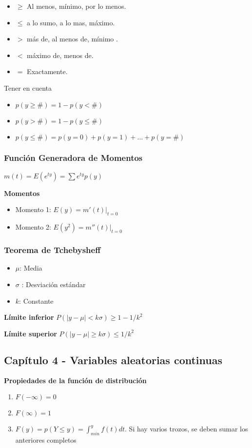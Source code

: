 \begin{itemize}
	\item $\geq$ Al menos, mínimo, por lo menos.
	\item $\leq$ a lo sumo, a lo mas, máximo.
	\item $>$ más de, al menos de, mínimo .
	\item $<$ máximo de, menos de.
	\item $=$ Exactamente.
\end{itemize}

Tener en cuenta
\begin{itemize}
	\item $p(y\geq \#)=1-p(y<\#)$
	\item $p(y> \#)=1-p(y\leq\#)$
	\item $p(y\leq\#)=p(y=0)+p(y=1)+\dots+p(y=\#)$
\end{itemize}

\subsubsection{Función Generadora de Momentos}
$m(t)=E(e^{ty})=\sum e^{ty}p(y)$

\textbf{Momentos}
\begin{itemize}
	\item Momento 1: $E(y)=m'(t)|_{t=0}$
	\item Momento 2: $E(y^2)=m''(t)|_{t=0}$
\end{itemize}

\subsubsection{Teorema de Tchebysheff}

\begin{itemize}
	\item $\mu$: Media
	\item $\sigma$ : Desviación estándar
	\item $k$: Constante
\end{itemize}

\textbf{Límite inferior}
$P(|y-\mu|<k\sigma)\geq 1- 1/k^2$

\textbf{Límite superior}
$P(|y-\mu|\geq k\sigma)\leq 1/k^2$

\subsection{Capítulo 4 - Variables aleatorias continuas}
\textbf{Propiedades de la función de distribución}
\begin{enumerate}
	\item $F(-\infty)=0$
	\item $F(\infty)=1$
	\item $F(y) =p(Y\leq y)= \int_{min}^{y}f(t)dt$. Si hay varios trozos, se deben sumar los anteriores completos
\end{enumerate}

